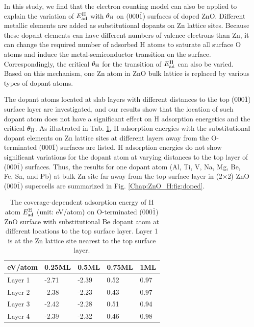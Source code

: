 In this study, we find that the electron counting model can also be applied to explain the variation of $E_{\textup{ad}}^{\textup{H}}$ with $\theta_{\textup{H}}$ on (000$\overline{1}$) surfaces of doped ZnO\cite{pashley1989electron}. Different metallic elements are added as substitutional dopants on Zn lattice sites. Because these dopant elements can have different numbers of valence electrons than Zn, it can change the required number of adsorbed H atoms to saturate all surface O atoms and induce the metal-semiconductor transition on the surface. Correspondingly, the critical $\theta_{\textup{H}}$ for the transition of $E_{\textup{ad}}^{\textup{H}}$ can also be varied.  Based on this mechanism, one Zn atom in ZnO bulk lattice is replaced by various types of dopant atoms. 

The dopant atoms located at slab layers with different distances to the top (000$\overline{1}$) surface layer are investigated, and our results show that the location of such dopant atom does not have a significant effect on H adsorption energetics and the critical $\theta_{\textup{H}}$. As illustrated in Tab. \ref{tab:layer}, H adsorption energies with the substitutional dopant elements on Zn lattice sites at different layers away from the O-terminated (000$\bar{1}$) surfaces are listed. H adsorption energies do not show significant variations for the dopant atom at varying distances to the top layer of (000$\bar{1}$) surfaces. Thus, the results for one dopant atom (Al, Ti, V, Na, Mg, Be, Fe, Sn, and Pb) at bulk Zn site far away from the top surface layer in (2$\times$2) ZnO (000$\overline{1}$) supercells are summarized in Fig. \ref{Chap:ZnO_H:fig:doped}. 

\begin{table}[!htbp]
\centering
\caption[Comparison of different doping locations to the top surface layer]{The coverage-dependent adsorption energy of H atom $E_{\textup{ad}}^{\textup{H}}$ (unit: eV/atom) on O-terminated  (000$\bar{1}$) ZnO surface with substitutional Be dopant atom at different locations to the top surface layer. Layer 1 is at the Zn lattice site nearest to the top surface layer.}
\label{tab:layer}
\begin{tabular}{lllll}
\hline
eV/atom      & 0.25ML & 0.5ML & 0.75ML & 1ML  \\ \hline
Layer 1      & -2.71  & -2.39 & 0.52   & 0.97 \\
Layer 2      & -2.38  & -2.23 & 0.43   & 0.97 \\
Layer 3      & -2.42  & -2.28 & 0.51   & 0.94 \\
Layer 4      & -2.39  & -2.32 & 0.46   & 0.98 \\\hline
\end{tabular}
\end{table}

